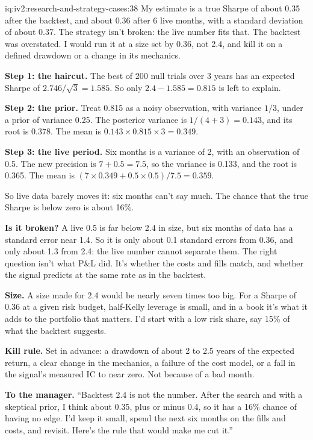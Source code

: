 \begin{solution}{iq:iv2:research-and-strategy-cases:38}
My estimate is a true Sharpe of about 0.35 after the backtest, and about 0.36 after 6 live months, with a standard deviation of about 0.37. The strategy isn't broken: the live number fits that. The backtest was overstated. I would run it at a size set by 0.36, not 2.4, and kill it on a defined drawdown or a change in its mechanics.

\textbf{Step 1: the haircut.} The best of 200 null trials over 3 years has an expected Sharpe of $2.746/\sqrt{3} = 1.585$. So only $2.4 - 1.585 = 0.815$ is left to explain.

\textbf{Step 2: the prior.} Treat 0.815 as a noisy observation, with variance $1/3$, under a prior of variance 0.25. The posterior variance is $1/(4 + 3) = 0.143$, and its root is 0.378. The mean is $0.143 \times 0.815 \times 3 = 0.349$.

\textbf{Step 3: the live period.} Six months is a variance of 2, with an observation of 0.5. The new precision is $7 + 0.5 = 7.5$, so the variance is 0.133, and the root is 0.365. The mean is $(7 \times 0.349 + 0.5 \times 0.5)/7.5 = 0.359$.

So live data barely moves it: six months can't say much. The chance that the true Sharpe is below zero is about 16\%.

\textbf{Is it broken?} A live 0.5 is far below 2.4 in size, but six months of data has a standard error near 1.4. So it is only about 0.1 standard errors from 0.36, and only about 1.3 from 2.4: the live number cannot separate them. The right question isn't what P\&L did. It's whether the costs and fills match, and whether the signal predicts at the same rate as in the backtest.

\textbf{Size.} A size made for 2.4 would be nearly seven times too big. For a Sharpe of 0.36 at a given risk budget, half-Kelly leverage is small, and in a book it's what it adds to the portfolio that matters. I'd start with a low risk share, say 15\% of what the backtest suggests.

\textbf{Kill rule.} Set in advance: a drawdown of about 2 to 2.5 years of the expected return, a clear change in the mechanics, a failure of the cost model, or a fall in the signal's measured IC to near zero. Not because of a bad month.

\textbf{To the manager.} ``Backtest 2.4 is not the number. After the search and with a skeptical prior, I think about 0.35, plus or minus 0.4, so it has a 16\% chance of having no edge. I'd keep it small, spend the next six months on the fills and costs, and revisit. Here's the rule that would make me cut it.''

\end{solution}

